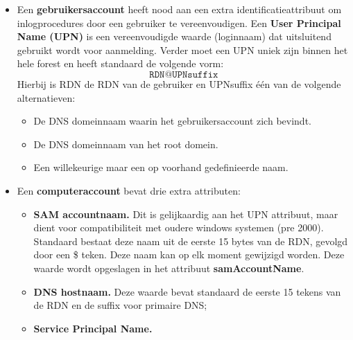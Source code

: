 \documentclass{report}
\begin{document}
\begin{enumerate}
		 { 		
			\begin{itemize}
				\item Een \textbf{gebruikersaccount} heeft nood aan een extra identificatieattribuut om inlogprocedures door een gebruiker te vereenvoudigen. Een \textbf{User Principal Name (UPN)} is een vereenvoudigde waarde (loginnaam) dat uitsluitend gebruikt wordt voor aanmelding. Verder moet een UPN uniek zijn binnen het hele forest en heeft standaard de volgende vorm:
				$$\texttt{RDN@UPNsuffix}$$
				Hierbij is RDN de RDN van de gebruiker en UPNsuffix één van de volgende alternatieven:
				\begin{itemize}
					\item De DNS domeinnaam waarin het gebruikersaccount zich bevindt.
					\item De DNS domeinnaam van het root domein.
					\item Een willekeurige maar een op voorhand gedefinieerde naam.
				\end{itemize}
				
				\item Een \textbf{computeraccount} bevat drie extra attributen:
				\begin{itemize}
					\item \textbf{SAM accountnaam.} Dit is gelijkaardig aan het UPN attribuut, maar dient voor compatibiliteit met oudere windows systemen (pre 2000). Standaard bestaat deze naam uit de eerste 15 bytes van de RDN, gevolgd door een \$ teken. Deze naam kan op elk moment gewijzigd worden. Deze waarde wordt opgeslagen in het attribuut \textbf{samAccountName}.
					\item \textbf{DNS hostnaam.} Deze waarde bevat standaard de eerste 15 tekens van de RDN en de suffix voor primaire DNS;
					\item \textbf{Service Principal Name.}
				\end{itemize}
		\end{itemize}}
		

\end{enumerate}
\end{document}
